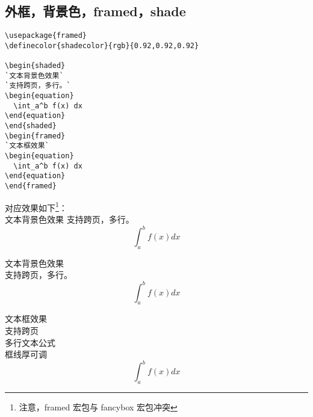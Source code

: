 \subsection{外框，背景色，framed，shade}

\begin{lstlisting}[language={[LaTeX]TeX}]
\usepackage{framed}
\definecolor{shadecolor}{rgb}{0.92,0.92,0.92}

\begin{shaded}
`文本背景色效果`
`支持跨页，多行。`
\begin{equation}
  \int_a^b f(x) dx
\end{equation}
\end{shaded}
\begin{framed}
`文本框效果`
\begin{equation}
  \int_a^b f(x) dx
\end{equation}
\end{framed}

\end{lstlisting}

对应效果如下\textcolor[rgb]{1.00,0.00,0.00}{\footnote{注意，framed 宏包与 fancybox 宏包冲突}}：\\
文本背景色效果
支持跨页，多行。
\begin{equation}
  \int_a^b f(x) dx
\end{equation}

\begin{shaded}
文本背景色效果\\
支持跨页，多行。
\begin{equation}
  \int_a^b f(x) dx
\end{equation}
\end{shaded}

\begin{framed}
文本框效果\\
支持跨页\\
多行文本公式\\
框线厚可调\\
\begin{equation}
  \int_a^b f(x) dx
\end{equation}
\end{framed}

%
%



